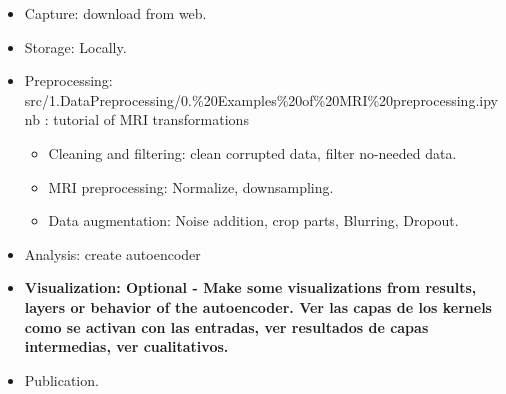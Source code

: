 \begin{itemize}
    \item Capture: download from web.
    \item Storage: Locally.
    \item Preprocessing: src/1.DataPreprocessing/0.\%20Examples\%20of\%20MRI\%20preprocessing.ipynb : tutorial of MRI transformations
    \begin{itemize}
        \item Cleaning and filtering: clean corrupted data, filter no-needed data.
        \item MRI preprocessing: Normalize, downsampling.
        \item Data augmentation: Noise addition, crop parts, Blurring, Dropout.
    \end{itemize}
    \item Analysis: create autoencoder
    \item \textbf{Visualization: Optional - Make some visualizations from results, layers or behavior of the autoencoder. Ver las capas de los kernels como se activan con las entradas, ver resultados de capas intermedias, ver cualitativos.}
    \item Publication.
\end{itemize}
\fi